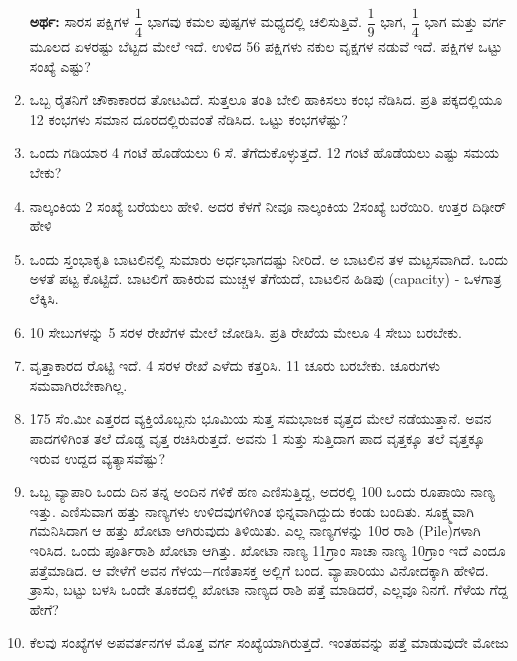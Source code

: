 \begin{enumerate}
\smallskip
{\bf ಅರ್ಥ:} ಸಾರಸ ಪಕ್ಷಿಗಳ $\dfrac{1}{4}$ ಭಾಗವು ಕಮಲ ಪುಷ್ಪಗಳ ಮಧ್ಯದಲ್ಲಿ ಚಲಿಸುತ್ತಿವೆ. $\dfrac{1}{9}$ ಭಾಗ, $\dfrac{1}{4}$ ಭಾಗ ಮತ್ತು ವರ್ಗ ಮೂಲದ ಏಳರಷ್ಟು ಬೆಟ್ಟದ ಮೇಲೆ ಇದೆ. ಉಳಿದ 56 ಪಕ್ಷಿಗಳು ನಕುಲ ವೃಕ್ಷಗಳ ನಡುವೆ ಇದೆ. ಪಕ್ಷಿಗಳ ಒಟ್ಟು ಸಂಖ್ಯೆ ಎಷ್ಟು? 

\smallskip
\item ಒಬ್ಬ ರೈತನಿಗೆ ಚೌಕಾಕಾರದ ತೋಟವಿದೆ. ಸುತ್ತಲೂ ತಂತಿ ಬೇಲಿ ಹಾಕಿಸಲು ಕಂಭ ನೆಡಿಸಿದ. ಪ್ರತಿ ಪಕ್ಕದಲ್ಲಿಯೂ 12 ಕಂಭಗಳು ಸಮಾನ ದೂರದಲ್ಲಿರುವಂತೆ ನೆಡಿಸಿದ. ಒಟ್ಟು ಕಂಭಗಳೆಷ್ಟು?

\item ಒಂದು ಗಡಿಯಾರ 4 ಗಂಟೆ ಹೊಡೆಯಲು 6 ಸೆ. ತೆಗೆದುಕೊಳ್ಳುತ್ತದೆ. 12 ಗಂಟೆ ಹೊಡೆಯಲು ಎಷ್ಟು ಸಮಯ ಬೇಕು? 

\item ನಾಲ್ಕಂಕಿಯ 2 ಸಂಖ್ಯೆ ಬರೆಯಲು ಹೇಳಿ. ಅದರ ಕೆಳಗೆ ನೀವೂ ನಾಲ್ಕಂಕಿಯ 2\break ಸಂಖ್ಯೆ  ಬರೆಯಿರಿ. ಉತ್ತರ ದಿಢೀರ್ ಹೇಳಿ

\item ಒಂದು ಸ್ತಂಭಾಕೃತಿ ಬಾಟಲಿನಲ್ಲಿ ಸುಮಾರು ಅರ್ಧಭಾಗದಷ್ಟು ನೀರಿದೆ. ಅ ಬಾಟಲಿನ ತಳ ಮಟ್ಟಸವಾಗಿದೆ. ಒಂದು ಅಳತೆ ಪಟ್ಟ ಕೊಟ್ಟಿದೆ. ಬಾಟಲಿಗೆ ಹಾಕಿರುವ ಮುಚ್ಚಳ ತೆಗೆಯದೆ, ಬಾಟಲಿನ ಹಿಡಿಪು (capacity) - ಒಳಗಾತ್ರ ಲೆಕ್ಕಿಸಿ. 

\item 10 ಸೇಬುಗಳನ್ನು 5 ಸರಳ ರೇಖೆಗಳ ಮೇಲೆ ಜೋಡಿಸಿ. ಪ್ರತಿ ರೇಖೆಯ ಮೇಲೂ 4 ಸೇಬು ಬರಬೇಕು. 

\item ವೃತ್ತಾಕಾರದ ರೊಟ್ಟಿ ಇದೆ. 4 ಸರಳ ರೇಖೆ ಎಳೆದು ಕತ್ತರಿಸಿ. 11 ಚೂರು ಬರಬೇಕು. ಚೂರುಗಳು ಸಮವಾಗಿರಬೇಕಾಗಿಲ್ಲ. 

\item 175 ಸೆಂ.ಮೀ ಎತ್ತರದ ವ್ಯಕ್ತಿಯೊಬ್ಬನು ಭೂಮಿಯ ಸುತ್ತ ಸಮಭಾಜಕ ವೃತ್ತದ ಮೇಲೆ ನಡೆಯುತ್ತಾನೆ. ಅವನ ಪಾದಗಳಿಗಿಂತ ತಲೆ ದೊಡ್ಡ ವೃತ್ತ ರಚಿಸಿರುತ್ತದೆ. ಅವನು 1 ಸುತ್ತು ಸುತ್ತಿದಾಗ ಪಾದ ವೃತ್ತಕ್ಕೂ ತಲೆ ವೃತ್ತಕ್ಕೂ ಇರುವ ಉದ್ದದ ವ್ಯತ್ಯಾಸವೆಷ್ಟು? 

\eject

\item ಒಬ್ಬ ವ್ಯಾಪಾರಿ ಒಂದು ದಿನ ತನ್ನ ಅಂದಿನ ಗಳಿಕೆ ಹಣ ಎಣಿಸುತ್ತಿದ್ದ, ಅದರಲ್ಲಿ 100 ಒಂದು ರೂಪಾಯಿ ನಾಣ್ಯ ಇತ್ತು. ಎಣಿಸುವಾಗ ಹತ್ತು ನಾಣ್ಯಗಳು ಉಳಿದವುಗಳಿಗಿಂತ ಭಿನ್ನವಾಗಿದ್ದುದು ಕಂಡು ಬಂದಿತು. ಸೂಕ್ಷ್ಮವಾಗಿ ಗಮನಿಸಿದಾಗ ಆ ಹತ್ತು ಖೋಟಾ ಆಗಿರುವುದು ತಿಳಿಯಿತು. ಎಲ್ಲ ನಾಣ್ಯಗಳನ್ನು 10ರ ರಾಶಿ (Pile)ಗಳಾಗಿ ಇರಿಸಿದ. ಒಂದು ಪೂರ್ತಿರಾಶಿ ಖೋಟಾ ಆಗಿತ್ತು. ಖೋಟಾ ನಾಣ್ಯ 11ಗ್ರಾಂ ಸಾಚಾ ನಾಣ್ಯ 10ಗ್ರಾಂ ಇದೆ ಎಂದೂ ಪತ್ತೆಮಾಡಿದ. ಆ ವೇಳೆಗೆ ಅವನ ಗೆಳಯ$-$ಗಣಿತಾಸಕ್ತ ಅಲ್ಲಿಗೆ ಬಂದ. ವ್ಯಾಪಾರಿಯು ವಿನೋದಕ್ಕಾಗಿ ಹೇಳಿದ. ತ್ರಾಸು, ಬಟ್ಟು ಬಳಸಿ ಒಂದೇ ತೂಕದಲ್ಲಿ ಖೋಟಾ ನಾಣ್ಯದ ರಾಶಿ ಪತ್ತೆ ಮಾಡಿದರೆ, ಎಲ್ಲವೂ ನಿನಗೆ. ಗೆಳೆಯ ಗೆದ್ದ ಹೇಗೆ?

\item ಕೆಲವು ಸಂಖ್ಯೆಗಳ ಅಪವರ್ತನಗಳ ಮೊತ್ತ ವರ್ಗ ಸಂಖ್ಯೆಯಾಗಿರುತ್ತದೆ. ಇಂತಹವನ್ನು ಪತ್ತೆ ಮಾಡುವುದೇ ಮೋಜು 


\end{enumerate}
